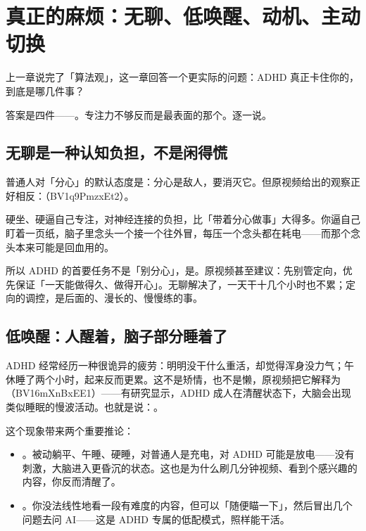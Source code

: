 \section{真正的麻烦：无聊、低唤醒、动机、主动切换}

上一章说完了「算法观」，这一章回答一个更实际的问题：ADHD 真正卡住你的，到底是哪几件事？

答案是四件——。专注力不够反而是最表面的那个。逐一说。

\subsection{无聊是一种认知负担，不是闲得慌}

普通人对「分心」的默认态度是：分心是敌人，要消灭它。但原视频给出的观察正好相反：（BV1q9PmzxEt2）。

硬坐、硬逼自己专注，对神经连接的负担，比「带着分心做事」大得多。你逼自己盯着一页纸，脑子里念头一个接一个往外冒，每压一个念头都在耗电——而那个念头本来可能是回血用的。

所以 ADHD 的首要任务不是「别分心」，是。原视频甚至建议：先别管定向，优先保证「一天能做得久、做得开心」。无聊解决了，一天干十几个小时也不累；定向的调控，是后面的、漫长的、慢慢练的事。

\subsection{低唤醒：人醒着，脑子部分睡着了}

ADHD 经常经历一种很诡异的疲劳：明明没干什么重活，却觉得浑身没力气；午休睡了两个小时，起来反而更累。这不是矫情，也不是懒，原视频把它解释为（BV16mXnBxEE1）——有研究显示，ADHD 成人在清醒状态下，大脑会出现类似睡眠的慢波活动。也就是说：。

这个现象带来两个重要推论：

\begin{itemize}
  \item {}。被动躺平、午睡、硬睡，对普通人是充电，对 ADHD 可能是放电——没有刺激，大脑进入更昏沉的状态。这也是为什么刷几分钟视频、看到个感兴趣的内容，你反而清醒了。
  \item {}。你没法线性地看一段有难度的内容，但可以「随便瞄一下」，然后冒出几个问题去问 AI——这是 ADHD 专属的低配模式，照样能干活。
\end{itemize}

